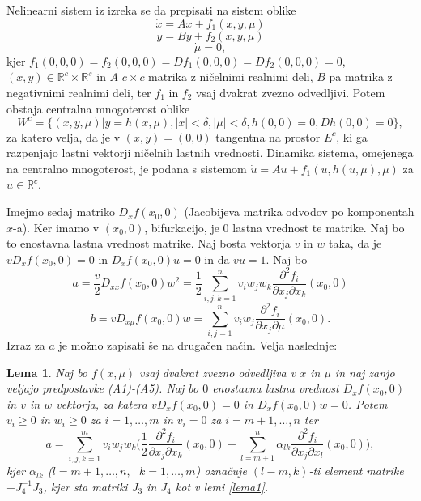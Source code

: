 \documentclass[a4paper,12pt]{article}
\newtheorem{lema}{Lema}
\begin{document}
Nelinearni sistem iz izreka se da prepisati na sistem oblike 
\[\dot{x}=Ax+f_1(x,y,\mu)\]
\[\dot{y}=By+f_2(x,y,\mu)\]
\[\dot{\mu}=0,\]
kjer \(f_1(0,0,0)=f_2(0,0,0)=Df_1(0,0,0)=Df_2(0,0,0)=0\), \((x,y)\in \mathbb{R}^c\times \mathbb{R}^s\) 
in \(A\) \(c \times c\) matrika z ničelnimi realnimi deli, \(B\) pa matrika z negativnimi realnimi deli, 
ter \(f_1\) in \(f_2\) vsaj dvakrat zvezno odvedljivi. Potem obstaja 
centralna mnogoterost oblike
\[W^c=\{(x,y,\mu)|y=h(x,\mu), |x|<\delta, |\mu|<\delta, h(0,0)=0, Dh(0,0)=0\},\]
za katero velja, da je v \((x,y)=(0,0)\) tangentna na prostor \(E^c\), ki ga razpenjajo lastni vektorji ničelnih lastnih vrednosti. 
Dinamika sistema, omejenega na centralno mnogoterost, je podana s sistemom 
\(\dot{u}=Au+f_1(u,h(u,\mu),\mu)\) za \(u\in \mathbb{R}^c\).

Imejmo sedaj matriko \(D_xf(x_0,0)\) (Jacobijeva matrika odvodov po komponentah \(x\)-a). 
Ker imamo v \((x_0,0)\), bifurkacijo, je \(0\) lastna vrednost te matrike. Naj bo 
to enostavna lastna vrednost matrike. Naj bosta vektorja \(v\) in \(w\) taka, da je 
\(vD_xf(x_0,0)=0\) in \(D_xf(x_0,0)u=0\) in da \(vu=1\).
Naj bo 
\begin{equation}\label{eq5}
a=\frac{v}{2}D_{xx}f(x_0,0)w^2=\frac{1}{2}\sum_{i,j,k=1}^n v_iw_jw_k\frac{\partial^2f_i}{\partial x_j \partial x_k}(x_0,0)
\end{equation}
\[b=vD_{x\mu}f(x_0,0)w=\sum_{i,j=1}^n v_i w_j \frac{\partial^2 f_i}{\partial x_j \partial \mu}(x_0,0).\]
Izraz za \(a\) je možno zapisati še na drugačen način. Velja naslednje:

\begin{lema}\label{lema2}
    Naj bo \(f(x,\mu)\) vsaj dvakrat zvezno odvedljiva v 
    \(x\) in \(\mu\) in naj zanjo veljajo predpostavke (A1)-(A5).
    Naj bo \(0\) enostavna lastna vrednost \(D_xf(x_0,0)\) in \(v\) in \(w\)
    vektorja, za katera \(vD_xf(x_0,0)=0\) in \(D_xf(x_0,0)w=0\). 
    Potem \(v_i\geq 0\) in \(w_i\geq 0\) za \(i=1,\ldots, m\) in 
    \(v_i=0\) za \(i=m+1,\ldots,n\) ter 
    \[a=\sum_{i,j,k=1}^m v_i w_j w_k \big(\frac{1}{2}\frac{\partial^2 f_i}{\partial x_j \partial x_k}(x_0,0)+\sum_{l=m+1}^n \alpha_{lk}\frac{\partial^2 f_i}{\partial x_j \partial x_l}(x_0,0)\big),\]
    kjer \(\alpha_{lk}\) (\(l=m+1,\ldots,n,\textrm{ }k=1,\ldots,m\)) označuje 
    \((l-m,k)\)-ti element matrike \(-J_4^{-1}J_3\), kjer sta matriki \(J_3\) in \(J_4\)
    kot v lemi \ref{lema1}.
\end{lema}
\end{document}
